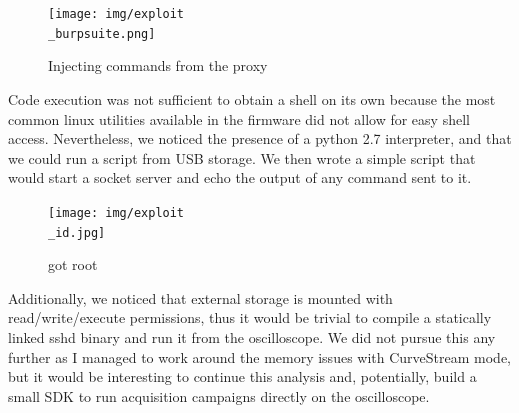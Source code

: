 \documentclass[a4paper,english,twoside,10pt]{article}
\begin{document}
\begin{figure}[htbp]
	\centering
	\texttt{[image: img/exploit\\\_burpsuite.png]}
	\caption{Injecting commands from the proxy}\label{fig:exploit-burpsuite}
\end{figure}

Code execution was not sufficient to obtain a shell on its own because the most common linux utilities available in the firmware did not allow for easy shell access. Nevertheless, we noticed the presence of a python 2.7 interpreter, and that we could run a script from USB storage. We then wrote a simple script that would start a socket server and echo the output of any command sent to it.

\begin{figure}[htbp]
	\centering
	\texttt{[image: img/exploit\\\_id.jpg]}
	\caption{got root}\label{fig:exploit-id}
\end{figure}

Additionally, we noticed that external storage is mounted with read/write/execute permissions, thus it would be trivial to compile a statically linked sshd binary and run it from the oscilloscope. We did not pursue this any further as I managed to work around the memory issues with CurveStream mode, but it would be interesting to continue this analysis and, potentially, build a small SDK to run acquisition campaigns directly on the oscilloscope.
\end{document}
